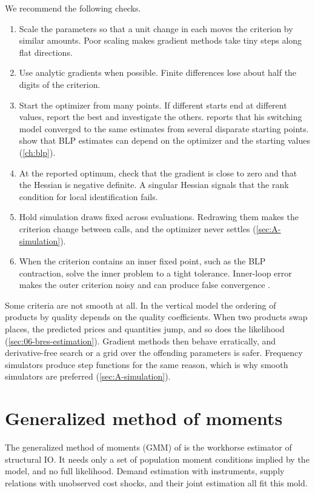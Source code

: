 We recommend the following checks.
\begin{enumerate}
  \item Scale the parameters so that a unit change in each moves the criterion by similar amounts. Poor scaling
  makes gradient methods take tiny steps along flat directions.
  \item Use analytic gradients when possible. Finite differences lose about half the digits of the criterion.
  \item Start the optimizer from many points. If different starts end at different values, report the best and
  investigate the others. \citet[p.~309]{Porter1983} reports that his switching model converged to the same estimates
  from several disparate starting points. \citet{KnittelMetaxoglou2014} show that BLP estimates can depend on the
  optimizer and the starting values (\cref{ch:blp}).
  \item At the reported optimum, check that the gradient is close to zero and that the Hessian is negative definite.
  A singular Hessian signals that the rank condition for local identification fails.
  \item Hold simulation draws fixed across evaluations. Redrawing them makes the criterion change between calls, and the
  optimizer never settles (\cref{sec:A-simulation}).
  \item When the criterion contains an inner fixed point, such as the BLP contraction, solve the inner problem to a
  tight tolerance. Inner-loop error makes the outer criterion noisy and can produce false convergence
  \citep{DubeFoxSu2012}.
\end{enumerate}

Some criteria are not smooth at all. In the vertical model the ordering of products by quality depends on the quality
coefficients. When two products swap places, the predicted prices and quantities jump, and so does the likelihood
(\cref{sec:06-bres-estimation}). Gradient methods then behave erratically, and derivative-free search or a grid over the
offending parameters is safer. Frequency simulators produce step functions for the same reason, which is why smooth
simulators are preferred (\cref{sec:A-simulation}).

\section{Generalized method of moments}\label{sec:A-gmm}

The generalized method of moments (GMM) of \citet{Hansen1982} is the workhorse estimator of structural IO. It needs only
a set of population moment conditions implied by the model, and no full likelihood. Demand estimation with instruments,
supply relations with unobserved cost shocks, and their joint estimation all fit this mold.

